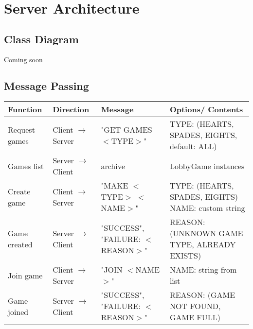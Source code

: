 \section{Server Architecture}
\subsection{Class Diagram}
Coming soon
\subsection{Message Passing}
\begin{center}
\begin{tabular}{|m{8em}|m{7em}|m{12em}|m{6em}|}
\hline
Function & Direction & Message & Options/ Contents \\
\hline\hline
Request games & Client $\rightarrow$ Server & "GET GAMES $<$TYPE$>$" & TYPE: (HEARTS, SPADES, EIGHTS, default: ALL)\\
\hline
Games list & Server $\rightarrow$ Client & archive & LobbyGame instances\\
\hline
Create game & Client $\rightarrow$ Server & "MAKE $<$TYPE$>$ $<$NAME$>$" & TYPE: (HEARTS, SPADES, EIGHTS) NAME: custom string\\
\hline
Game created & Server $\rightarrow$ Client & "SUCCESS", "FAILURE: $<$REASON$>$" & REASON: (UNKNOWN GAME TYPE, ALREADY EXISTS)\\
\hline
Join game & Client $\rightarrow$ Server & "JOIN $<$NAME$>$" & NAME: string from list\\
\hline
Game joined & Server $\rightarrow$ Client & "SUCCESS", "FAILURE: $<$REASON$>$" & REASON: (GAME NOT FOUND, GAME FULL)\\
\hline
\end{tabular}
\end{center}
